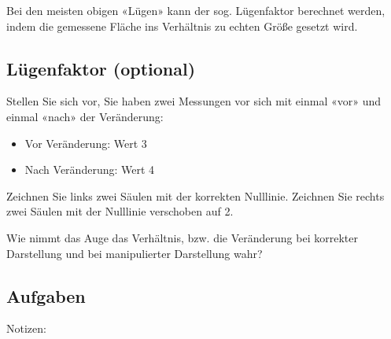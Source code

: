 Bei den meisten obigen «Lügen» kann der sog. Lügenfaktor berechnet werden, indem die gemessene Fläche ins Verhältnis zu echten Größe gesetzt wird.
\newpage
\subsection*{Lügenfaktor (optional)}
Stellen Sie sich vor, Sie haben zwei Messungen vor sich mit einmal «vor» und einmal «nach» der Veränderung:
\begin{itemize}
\item Vor Veränderung: Wert 3
\item Nach Veränderung: Wert 4
\end{itemize}

Zeichnen Sie links zwei Säulen mit der korrekten Nulllinie. Zeichnen Sie rechts zwei Säulen mit der Nulllinie verschoben auf 2.


Wie nimmt das Auge das Verhältnis, bzw. die Veränderung bei korrekter Darstellung und bei manipulierter Darstellung wahr?

\newpage

\subsection*{Aufgaben}

Notizen:



\newpage
